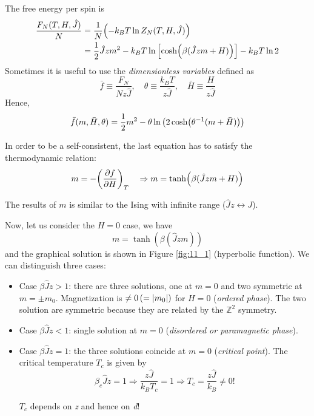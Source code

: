 \documentclass[../main/main.tex]{subfiles}
\begin{document}
The free energy per spin is
\begin{equation}
\begin{split}
  \frac{F_N (T,H,\hat{J} )}{N} & = \frac{1}{N} \qty(-k_B T \ln{Z_N(T,H,\hat{J} )} ) \\
  & = \frac{1}{2} \hat{J} z m^2 - k_B T \ln{\qty[\cosh(\beta (\hat{J}zm+H ))] } - k_B T \ln{2}
\end{split}
\end{equation}
Sometimes it is useful to use the \emph{dimensionless variables} defined as
\begin{equation}
  \bar{f} \equiv \frac{F_N}{N z \hat{J} }, \quad \theta \equiv \frac{k_B T}{z \hat{J} }, \quad \bar{H} \equiv \frac{H}{z \hat{J} }
\end{equation}
Hence,
\begin{equation}
  \bar{f} (m, \bar{H}, \theta  ) = \frac{1}{2}m^2 - \theta \ln{\qty(2 \cosh (\theta ^{-1}(m+\bar{H} ))) }
\end{equation}

In order to be a self-consistent, the last equation has to satisfy the  thermodynamic relation:
\begin{equation*}
  m = - \qty( \pdv{f}{H})_T \quad \Rightarrow   m = \tanh (\beta (\hat{J}z m + H  ))
\end{equation*}
\begin{remark}
The results of \( m \)  is similar to the Ising with infinite range (\( \hat{J}z \leftrightarrow J  \)).
\end{remark}

Now, let us consider the \( H=0 \) case, we have
\begin{equation}
  m =  \tanh (\beta (\hat{J}z m ))
\end{equation}
and the graphical solution is shown in Figure \ref{fig:11_1} (hyperbolic function).
We can distinguish three cases:
\begin{itemize}
\item Case \( \beta \hat{J} z > 1  \): there are three solutions, one at \( m=0 \) and two symmetric at \( m=\pm m_0 \). Magnetization is \( \neq 0 \, (= \abs{m_0} )\) for \( H=0 \) (\emph{ordered phase}).  The two solution are symmetric because they are related by the \( \mathbb{Z}^2 \)  symmetry.
\item Case \( \beta \hat{J} z < 1  \): single solution at \( m=0 \) (\emph{disordered or paramagnetic phase}).
\item Case \( \beta \hat{J} z = 1  \): the three solutions coincide at \( m=0 \) (\emph{critical point}). 
The critical temperature \( T_c \) is given by
\begin{equation*}
 \beta_c \hat{J} z = 1 \Rightarrow  \frac{z \hat{J} }{k_B T_c} = 1 \Rightarrow T_c = \frac{z \hat{J} }{k_B} \neq 0!
\end{equation*}
\begin{remark}
\( T_c \) depends on \emph{z} and hence on \emph{d}!
\end{remark}
\end{itemize}
\end{document}
